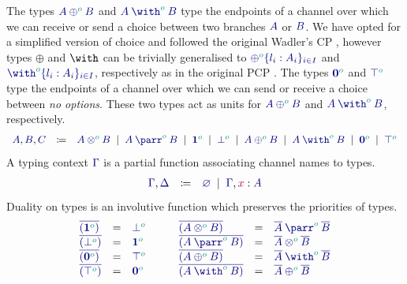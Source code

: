 \documentclass[main.tex]{subfiles}
\begin{document}
The types $\ty{\typlus[\cs{o}]{A}{B}}$ and $\ty{\tywith[\cs{o}]{A}{B}}$ type the endpoints of a channel over which we can receive or send a choice between two branches $\ty{A}$ or $\ty{B}$. We have opted for a simplified version of choice and followed the original Wadler's CP \cite{wadler2012}, however types $\oplus$ and $\with$ can be trivially generalised to $\ty{\oplus^{\cs{o}}\{l_i:A_i\}_{i\in I}}$ and $\ty{\with^{\cs{o}}\{l_i:A_i\}_{i\in I}}$, respectively as in the original PCP \cite{dardha2018}.
The types $\ty{\tynil[\cs{o}]}$ and $\ty{\tytop[\cs{o}]}$ type the endpoints of a channel over which we can send or receive a choice between \emph{no options}. These two types act as units for $\ty{\typlus[\cs{o}]{A}{B}}$ and $\ty{\tywith[\cs{o}]{A}{B}}$, respectively.
\[
\begin{array}{lcl}
  \ty{A}, \ty{B}, \ty{C}
  & \coloneqq & \ty{\tytens[\cs{o}]{A}{B}}
    \sep        \ty{\typarr[\cs{o}]{A}{B}}
    \sep        \ty{\tyone[\cs{o}]}
    \sep        \ty{\tybot[\cs{o}]}
    \sep        \ty{\typlus[\cs{o}]{A}{B}}
    \sep        \ty{\tywith[\cs{o}]{A}{B}}
    \sep        \ty{\tynil[\cs{o}]}
    \sep        \ty{\tytop[\cs{o}]}
\end{array}
\]
A typing context $\ty\Gamma$ is a partial function associating channel names to types.
\[
\begin{array}{lcl}
  \ty{\Gamma}, \ty{\Delta}
  & \coloneqq & \ty{\emptyenv}
    \sep        \ty{\Gamma}, \tmty{x}{A}
\end{array}
\]
Duality on types is an involutive function which preserves the priorities of types.
\[
\begin{array}{lcl}
  \ty{\co{(\tyone[\cs{o}])}} & = & \ty{\tybot[\cs{o}]} \\
  \ty{\co{(\tybot[\cs{o}])}} & = & \ty{\tyone[\cs{o}]} \\
  \ty{\co{(\tynil[\cs{o}])}} & = & \ty{\tytop[\cs{o}]} \\
  \ty{\co{(\tytop[\cs{o}])}} & = & \ty{\tynil[\cs{o}]}
\end{array}
\qquad
\begin{array}{lcl}
  \ty{\co{(\tytens[\cs{o}]{A}{B})}} & = & \ty{\typarr[\cs{o}]{\co{A}}{\co{B}}} \\
  \ty{\co{(\typarr[\cs{o}]{A}{B})}} & = & \ty{\tytens[\cs{o}]{\co{A}}{\co{B}}} \\
  \ty{\co{(\typlus[\cs{o}]{A}{B})}} & = & \ty{\tywith[\cs{o}]{\co{A}}{\co{B}}} \\
  \ty{\co{(\tywith[\cs{o}]{A}{B})}} & = & \ty{\typlus[\cs{o}]{\co{A}}{\co{B}}}
\end{array}
\]
\end{document}
